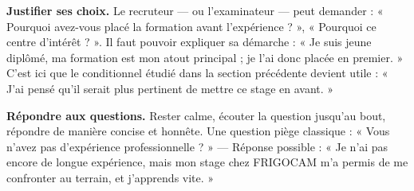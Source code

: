 \documentclass[11pt]{article}
\begin{document}
\textbf{Justifier ses choix.} Le recruteur — ou l'examinateur — peut demander : « Pourquoi avez-vous placé la formation avant l'expérience ? », « Pourquoi ce centre d'intérêt ? ». Il faut pouvoir expliquer sa démarche : « Je suis jeune diplômé, ma formation est mon atout principal ; je l'ai donc placée en premier. » C'est ici que le conditionnel étudié dans la section précédente devient utile : « J'ai pensé qu'il serait plus pertinent de mettre ce stage en avant. »

\textbf{Répondre aux questions.} Rester calme, écouter la question jusqu'au bout, répondre de manière concise et honnête. Une question piège classique : « Vous n'avez pas d'expérience professionnelle ? » — Réponse possible : « Je n'ai pas encore de longue expérience, mais mon stage chez FRIGOCAM m'a permis de me confronter au terrain, et j'apprends vite. »
\end{document}
